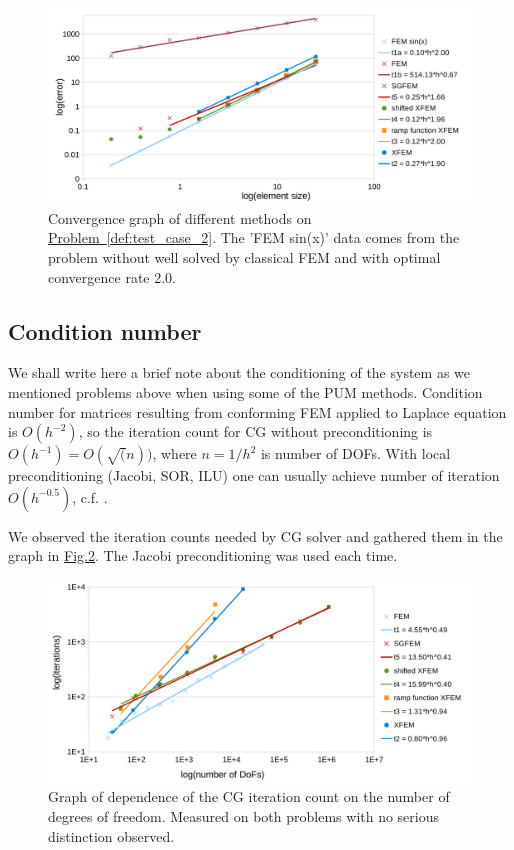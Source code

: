 \documentclass[preprint,12pt]{elsarticle}
\newcommand{\probref}[1]{\hyperref[#1]{Problem~\ref{#1}}}
\newcommand{\fig}[1]{\hyperref[#1]{Fig.\ref{#1}}}
\begin{document}
\begin{figure}[!htb]
  \centering    
  \includegraphics[width=\textwidth]{results/convergence_sin.pdf}
  \caption[Convergence graph \probref{def:test_case_2}]{Convergence graph of different methods on 
  \probref{def:test_case_2}. The 'FEM sin(x)'
  data comes from the problem without well solved by classical FEM and with optimal convergence rate 2.0.}
  \label{fig:convergence_sin}
\end{figure}

\subsection{Condition number}
We shall write here a brief note about the conditioning of the system as we mentioned problems above when using some of the PUM methods. 
Condition number for matrices resulting from conforming FEM applied to Laplace equation is $O(h^{-2})$, so the iteration count 
for CG without preconditioning is $O(h^{-1})=O(\sqrt(n))$, where $n=1/h^2$ is number of DOFs. With local preconditioning (Jacobi, 
SOR, ILU) one can usually achieve number of iteration $O(h^{-0.5})$, c.f. \cite{ern_evaluation_2006}.

We observed the iteration counts needed by CG solver and gathered them in the graph in \fig{fig:iterations}.
The Jacobi preconditioning was used each time. 

\begin{figure}[!htb]
  \centering    
  \includegraphics[width=\textwidth]{results/iterations.pdf}
  \caption[Iterations graph]{Graph of dependence of the CG iteration count on the 
  number of degrees of freedom. Measured on both problems with no serious distinction observed.}
  \label{fig:iterations}
\end{figure}
\end{document}
